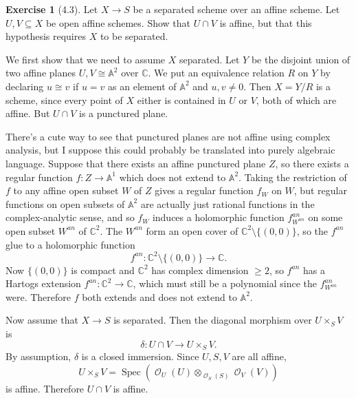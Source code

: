 \documentclass[10pt]{article}
\newcommand{\CC}{\mathbb{C}}
\newcommand{\Aff}{\mathbb A}
\newcommand{\Spec}{\operatorname{Spec}}
\DeclareMathOperator{\Olo}{\mathscr O}
\theoremstyle{definition}
\newtheorem{exer}{Exercise}
\begin{document}
\begin{exer}[4.3]
Let $X \to S$ be a separated scheme over an affine scheme.
Let $U, V \subseteq X$ be open affine schemes.
Show that $U \cap V$ is affine, but that this hypothesis requires $X$ to be separated.
\end{exer}

We first show that we need to assume $X$ separated.
Let $Y$ be the disjoint union of two affine planes $U, V \cong \Aff^2$ over $\CC$.
We put an equivalence relation $R$ on $Y$ by declaring $u \cong v$ if $u = v$ as an element of $\Aff^2$ and $u,v \neq 0$.
Then $X = Y/R$ is a scheme, since every point of $X$ either is contained in $U$ or $V$, both of which are affine.
But $U \cap V$ is a punctured plane.

There's a cute way to see that punctured planes are not affine using complex analysis, but I suppose this could probably be translated into purely algebraic language.
Suppose that there exists an affine punctured plane $Z$, so there exists a regular function $f: Z \to \Aff^1$ which does not extend to $\Aff^2$.
Taking the restriction of $f$ to any affine open subset $W$ of $Z$ gives a regular function $f_W$ on $W$, but regular functions on open subsets of $\Aff^2$ are actually just rational functions in the complex-analytic sense, and so $f_W$ induces a holomorphic function $f^{an}_{W^{an}}$ on some open subset $W^{an}$ of $\CC^2$.
The $W^{an}$ form an open cover of $\CC^2 \setminus \{(0, 0)\}$, so the $f^{an}$ glue to a holomorphic function
$$f^{an}: \CC^2 \setminus \{(0, 0)\} \to \CC.$$
Now $\{(0, 0)\}$ is compact and $\CC^2$ has complex dimension $\geq 2$, so $f^{an}$ has a Hartogs extension $f^{an}: \CC^2 \to \CC$, which must still be a polynomial since the $f^{an}_{W^{an}}$ were.
Therefore $f$ both extends and does not extend to $\Aff^2$.

Now assume that $X \to S$ is separated.
Then the diagonal morphism over $U \times_S V$ is
$$\delta: U \cap V \to U \times_S V.$$
By assumption, $\delta$ is a closed immersion. Since $U,S,V$ are all affine,
$$U \times_S V = \Spec(\Olo_U(U) \otimes_{\Olo_S(S)} \Olo_V(V))$$
is affine. Therefore $U \cap V$ is affine.
\end{document}

